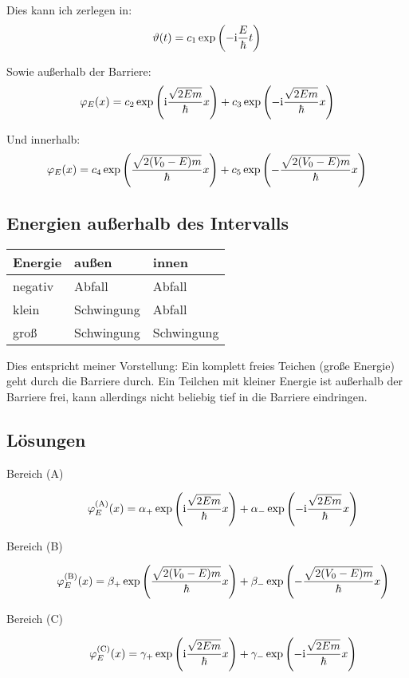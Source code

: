 Dies kann ich zerlegen in:
\[
	\vartheta(t) = c_1 \exp\del{-\ii\frac E\hbar t}
\]

Sowie außerhalb der Barriere:
\[
	\varphi_E(x) = c_2 \exp\del{\ii \frac{\sqrt{2Em}}\hbar x}
	+ c_3 \exp\del{-\ii \frac{\sqrt{2Em}}\hbar x}
\]

Und innerhalb:
\[
	\varphi_E(x) = c_4 \exp\del{\frac{\sqrt{2(V_0-E)m}}\hbar x}
	+ c_5 \exp\del{-\frac{\sqrt{2(V_0-E)m}}\hbar x}
\]

\subsection{Energien außerhalb des Intervalls}

\begin{tabular}{lll}
	Energie & außen & innen \\
	\hline
	negativ & Abfall & Abfall \\
	klein & Schwingung & Abfall \\
	groß & Schwingung & Schwingung
\end{tabular}

Dies entspricht meiner Vorstellung: Ein komplett freies Teichen (große Energie)
geht durch die Barriere durch. Ein Teilchen mit kleiner Energie ist außerhalb
der Barriere frei, kann allerdings nicht beliebig tief in die Barriere
eindringen.

\subsection{Lösungen}

\newcommand{\phiA}{\varphi_E^\text{(A)}}
\newcommand{\phiB}{\varphi_E^\text{(B)}}
\newcommand{\phiC}{\varphi_E^\text{(C)}}

\begin{description}
	\item[Bereich (A)]
		\[
			\phiA(x) = \alpha_+ \exp\del{\ii \frac{\sqrt{2Em}}\hbar x}
			+ \alpha_- \exp\del{-\ii \frac{\sqrt{2Em}}\hbar x}
		\]

	\item[Bereich (B)]
		\[
			\phiB(x) = \beta_+ \exp\del{\frac{\sqrt{2(V_0-E)m}}\hbar x}
			+ \beta_- \exp\del{-\frac{\sqrt{2(V_0-E)m}}\hbar x}
		\]

	\item[Bereich (C)]
		\[
			\phiC(x) = \gamma_+ \exp\del{\ii \frac{\sqrt{2Em}}\hbar x}
			+ \gamma_- \exp\del{-\ii \frac{\sqrt{2Em}}\hbar x}
		\]
\end{description}


